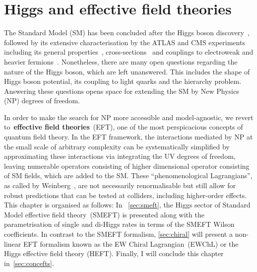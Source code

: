 \chapter{Higgs and effective field theories }\label{chap:HiggsEFT}
\par The Standard Model (SM) has been concluded after the Higgs boson discovery~\cite{ATLAS:2012yve,CMS:2012qbp}, followed by its extensive characterisation by the ATLAS and CMS experiments including its general properties~\cite{ATLAS:2015yey,ATLAS:2018tdk,CMS:2017dib,CMS:2020xrn,ATLAS:2018jym,CMS:2019ekd,ATLAS:2015zhl, CMS:2014nkk},  cross-sections~\cite{CMS:2018gwt,ATLAS:2019jst,ATLAS:2019mju,CMS:2019chr} and couplings to electroweak and heavier fermions~\cite{ATLAS2021vrm,CMS:2020gsy}. Nonetheless, there are many open questions regarding the nature of the Higgs boson, which are left unanswered. This includes the shape of Higgs boson potential, its coupling to light quarks and the hierarchy problem. Answering these questions opens space for extending the SM by New Physics (NP) degrees of freedom.
\par In order to make the search for NP more accessible and model-agnostic, we revert to~\textbf{effective field theories}~(EFT), one of the most perspicacious concepts of quantum field theory. In the EFT framework, the interactions mediated by NP at the small scale of arbitrary complexity can be systematically simplified by approximating these interactions via integrating the UV degrees of freedom, leaving numerable operators consisting of higher dimensional operator consisting of SM fields, which are added to the SM.  
These ``phenomenological Lagrangians'', as called by Weinberg~\cite{WEINBERG1979327}, are not necessarily renormalisable but still allow for robust predictions that can be tested at colliders, including higher-order effects. \\
This chapter is organised as follows:  In ~\autoref{sec:smeft}, the Higgs sector of Standard Model effective field theory~(SMEFT) is presented along with the parametrisation of single and di-Higgs rates in terms of the SMEFT Wilson coefficients. In contrast to the SMEFT formalism, \autoref{sec:chiral} will present a non-linear EFT formalism known as the EW Chiral Lagrangian~(EWChL) or the  Higgs effective field theory (HEFT). Finally, I will conclude this chapter in~\autoref{sec:concefts}.
